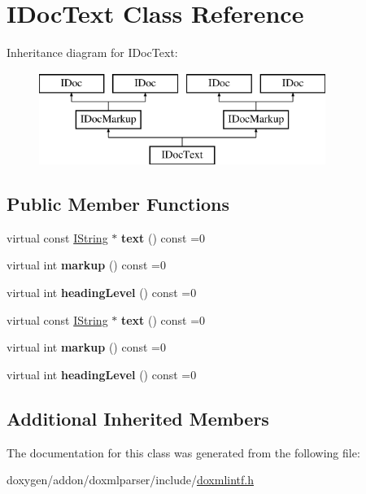\hypertarget{class_i_doc_text}{}\section{I\+Doc\+Text Class Reference}
\label{class_i_doc_text}
Inheritance diagram for I\+Doc\+Text\+:\begin{figure}[H]
\begin{center}
\leavevmode
\includegraphics[height=3.000000cm]{class_i_doc_text}
\end{center}
\end{figure}
\subsection*{Public Member Functions}
\begin{DoxyCompactItemize}
\item 
\mbox{\label{class_i_doc_text_a512acfb2dcead7bc72f870e24c161dce}} 
virtual const \mbox{\hyperlink{class_i_string}{I\+String}} $\ast$ {\bfseries text} () const =0
\item 
\mbox{\label{class_i_doc_text_af8d18fd5ac9eafda70c6940def270941}} 
virtual int {\bfseries markup} () const =0
\item 
\mbox{\label{class_i_doc_text_ab8b2503973c512e24015959fd457483f}} 
virtual int {\bfseries heading\+Level} () const =0
\item 
\mbox{\label{class_i_doc_text_a512acfb2dcead7bc72f870e24c161dce}} 
virtual const \mbox{\hyperlink{class_i_string}{I\+String}} $\ast$ {\bfseries text} () const =0
\item 
\mbox{\label{class_i_doc_text_af8d18fd5ac9eafda70c6940def270941}} 
virtual int {\bfseries markup} () const =0
\item 
\mbox{\label{class_i_doc_text_ab8b2503973c512e24015959fd457483f}} 
virtual int {\bfseries heading\+Level} () const =0
\end{DoxyCompactItemize}
\subsection*{Additional Inherited Members}


The documentation for this class was generated from the following file\+:\begin{DoxyCompactItemize}
\item 
doxygen/addon/doxmlparser/include/\mbox{\hyperlink{include_2doxmlintf_8h}{doxmlintf.\+h}}\end{DoxyCompactItemize}
